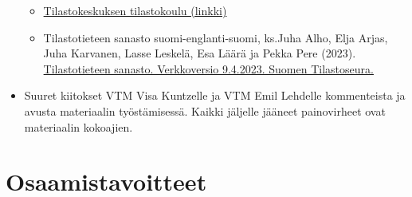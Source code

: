 \documentclass[
]{book}
\providecommand{\tightlist}{%
  \setlength{\itemsep}{0pt}\setlength{\parskip}{0pt}}
\begin{document}
\begin{itemize}
  \begin{itemize}
  \tightlist
  \item
    \href{https://tilastokoulu.stat.fi/verkkokoulu_v2.xql?course_id=tkoulu_tilaj\&lesson_id=1\&subject_id=0\&page_type=sisalto}{Tilastokeskuksen tilastokoulu (linkki)}
  \item
    Tilastotieteen sanasto suomi-englanti-suomi, ks.Juha Alho, Elja Arjas, Juha Karvanen, Lasse Leskelä, Esa Läärä ja Pekka Pere (2023). \href{https://sanasto.tilastoseura.fi/.}{Tilastotieteen sanasto. Verkkoversio 9.4.2023. Suomen Tilastoseura.}
  \end{itemize}
\item
  Suuret kiitokset VTM Visa Kuntzelle ja VTM Emil Lehdelle kommenteista ja avusta materiaalin työstämisessä. Kaikki jäljelle jääneet painovirheet ovat materiaalin kokoajien.
\end{itemize}

\hypertarget{osaamistavoitteet}{%
\chapter*{Osaamistavoitteet}\label{osaamistavoitteet}}
\end{document}
